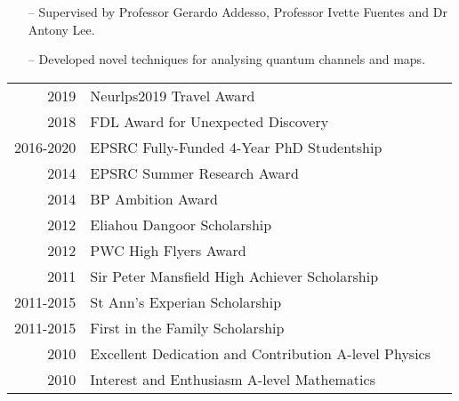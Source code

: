 \documentclass[10pt,a4paper]{altacv}
\begin{document}

\begin{itemize}
	\setlength{\itemindent}{0.5em}
	\item[--]   \small{Supervised by Professor Gerardo Addesso, Professor Ivette Fuentes and Dr Antony Lee.}
	\item[--]   \small{Developed novel techniques for analysing quantum channels and maps.}
\end{itemize}

\medskip





\begin{tabular}{rll}
	2019      & Neurlps2019 Travel Award                              \\
	2018      & FDL Award for Unexpected Discovery                    \\
	2016-2020 & EPSRC Fully-Funded 4-Year PhD Studentship             \\
	2014      & EPSRC Summer Research Award                           \\
	2014      & BP Ambition Award                                     \\
	2012      & Eliahou Dangoor Scholarship                           \\
	2012      & PWC High Flyers Award                                 \\
	2011      & Sir Peter Mansfield High Achiever Scholarship         \\
	2011-2015 & St Ann's Experian Scholarship                         \\
	2011-2015 & First in the Family Scholarship                       \\
	2010      & Excellent Dedication and Contribution A-level Physics \\
	2010      & Interest and Enthusiasm A-level Mathematics
\end{tabular}

\divider

%
\end{document}
